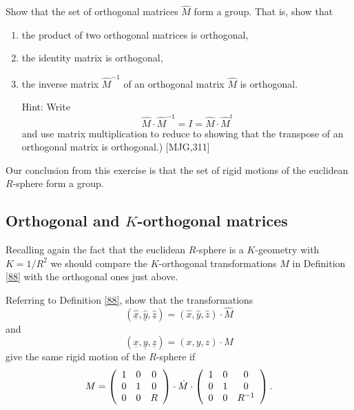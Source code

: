 \documentclass{ximera}
\begin{document}
\begin{exercise}
 Show that the set of orthogonal matrices $\hat{M}$ form a group.
That is, show that
\begin{enumerate}
\item the product of two orthogonal matrices is orthogonal,

\item the identity matrix is orthogonal,

\item the inverse matrix $\hat{M}^{-1}$ of an orthogonal matrix $\hat{M}$ is orthogonal.

Hint: Write%
\[
\hat{M}\cdot\hat{M}^{-1}=I=\hat{M}\cdot\hat{M}^{t}%
\]
and use matrix multiplication to reduce to showing that the transpose of an
orthogonal matrix is orthogonal.) [MJG,311]

\end{enumerate}
\end{exercise}

Our conclusion from this exercise is that the set of rigid motions of the
euclidean $R$-sphere form a group.

\subsection*{Orthogonal and $K$-orthogonal matrices}

Recalling again the fact that the euclidean $R$-sphere is a $K$-geometry with
$K=1/R^{2}$ we should compare the $K$-orthogonal transformations $M$ in
Definition \ref{88} with the orthogonal ones just above.

\begin{exercise}
 Referring to Definition \ref{88}, show that the transformations%
\[
\left(  \underline{\hat{x}},\underline{\hat{y}},\underline{\hat{z}}\right)
=\left(  \hat{x},\hat{y},\hat{z}\right)  \cdot\hat{M}%
\]
and%
\[
\left(  \underline{x},\underline{y},\underline{z}\right)  =\left(
x,y,z\right)  \cdot M
\]
give the same rigid motion of the $R$-sphere if
\[
M=\left(
\begin{array}
[c]{ccc}%
1 & 0 & 0\\
0 & 1 & 0\\
0 & 0 & R
\end{array}
\right)  \cdot\hat{M}\cdot\left(
\begin{array}
[c]{ccc}%
1 & 0 & 0\\
0 & 1 & 0\\
0 & 0 & R^{-1}%
\end{array}
\right)  .
\]

\end{exercise}
\end{document}
